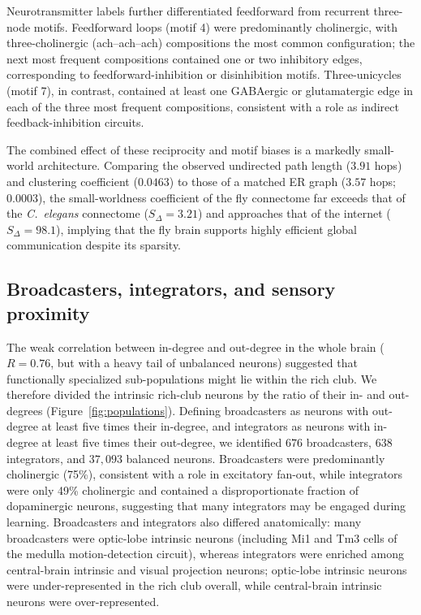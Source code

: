 \documentclass[11pt]{article}
\begin{document}
Neurotransmitter labels further differentiated feedforward from recurrent
three-node motifs. Feedforward loops (motif 4) were predominantly
cholinergic, with three-cholinergic (ach--ach--ach) compositions the most
common configuration; the next most frequent compositions contained one or
two inhibitory edges, corresponding to feedforward-inhibition or
disinhibition motifs. Three-unicycles (motif 7), in contrast, contained
at least one GABAergic or glutamatergic edge in each of the three most
frequent compositions, consistent with a role as indirect
feedback-inhibition circuits.

The combined effect of these reciprocity and motif biases is a markedly
small-world architecture. Comparing the observed undirected path length
($3.91$ hops) and clustering coefficient ($0.0463$) to those of a matched
ER graph ($3.57$ hops; $0.0003$), the small-worldness coefficient of the
fly connectome far exceeds that of the \textit{C.\ elegans} connectome
($S_\Delta = 3.21$) and approaches that of the internet
($S_\Delta = 98.1$), implying that the fly brain supports highly
efficient global communication despite its sparsity.

\subsection{Broadcasters, integrators, and sensory proximity}

The weak correlation between in-degree and out-degree in the whole brain
($R = 0.76$, but with a heavy tail of unbalanced neurons) suggested that
functionally specialized sub-populations might lie within the rich club.
We therefore divided the intrinsic rich-club neurons by the ratio of their
in- and out-degrees (Figure~\ref{fig:populations}). Defining broadcasters
as neurons with out-degree at least five times their in-degree, and
integrators as neurons with in-degree at least five times their
out-degree, we identified $676$ broadcasters, $638$ integrators, and
$37{,}093$ balanced neurons. Broadcasters were predominantly cholinergic
(75\%), consistent with a role in excitatory fan-out, while integrators
were only 49\% cholinergic and contained a disproportionate fraction of
dopaminergic neurons, suggesting that many integrators may be engaged
during learning. Broadcasters and integrators also differed anatomically:
many broadcasters were optic-lobe intrinsic neurons (including Mi1 and Tm3
cells of the medulla motion-detection circuit), whereas integrators were
enriched among central-brain intrinsic and visual projection neurons;
optic-lobe intrinsic neurons were under-represented in the rich club
overall, while central-brain intrinsic neurons were over-represented.
\end{document}
